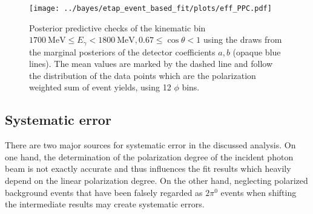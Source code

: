 \begin{figure}[htbp]
	\centering
	\texttt{[image: ../bayes/etap\_event\_based\_fit/plots/eff\_PPC.pdf]}
	\caption{Posterior predictive checks of the kinematic bin $\SI{1700}{\mega\eV}\leq E_\gamma<\SI{1800}{\mega\eV}, 0.67\leq\cos\theta<1$ using the draws from the marginal posteriors of the detector coefficients $a,b$ (opaque blue lines). The mean values are marked by the dashed line and follow the distribution of the data points which are the polarization weighted sum of event yields, using 12 $\phi$ bins.}	
	\label{fig:etap_eff}
\end{figure}
\subsection{Systematic error}
\label{subsec:sys}
There are two major sources for systematic error in the discussed analysis. On one hand, the determination of the polarization degree of the incident photon beam is not exactly accurate and thus influences the fit results which heavily depend on the linear polarization degree. On the other hand, neglecting polarized background events that have been falsely regarded as $2\pi^0$ events when shifting the intermediate results may create systematic errors. 

